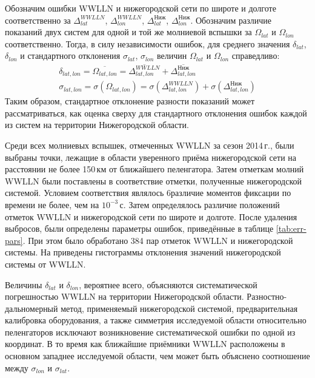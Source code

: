 Обозначим ошибки WWLLN и нижегородской сети по широте и долготе соответственно за $\Delta_{lat}^{WWLLN}$, $\Delta_{lon}^{WWLLN}$, $\Delta_{lat}^{\text{Ниж}}$, $\Delta_{lon}^{\text{Ниж}}$. Обозначим различие показаний двух систем для одной и той же молниевой вспышки за $\Omega_{lat}$ и $\Omega_{lon}$ соответственно. Тогда, в силу независимости ошибок, для среднего значения $\delta_{lat}$, $\delta_{lon}$ и стандартного отклонения $\sigma_{lat}$, $\sigma_{lon}$ величин $\Omega_{lat}$ и $\Omega_{lon}$ справедливо:
\begin{equation}
	\begin{gathered}
		\delta_{lat, lon} = \overline{\Omega_{lat,lon}} = \overline {\Delta_{lat,lon}^{WWLLN}} + \overline {\Delta_{lat,lon}^{\text{Ниж}}}\\
		\sigma_{lat, lon} = \sigma(\Omega_{lat,lon}) = \sigma (\Delta_{lat,lon}^{WWLLN}) + \sigma (\Delta_{lat,lon}^{\text{Ниж}})
	\end{gathered}
\end{equation}
Таким образом, стандартное отклонение разности показаний может рассматриваться, как оценка сверху для стандартного отклонения ошибок каждой из систем на территории Нижегородской области.

Среди всех молниевых вспышек, отмеченных WWLLN за сезон 2014\,г., были выбраны точки, лежащие в области уверенного приёма нижегородской сети на расстоянии не более 150\,км от ближайшего пеленгатора. Затем отметкам молний WWLLN были поставлены в соответствие отметки, полученные нижегородской системой. Условием соответствия являлось 6различие моментов фиксации по времени не более, чем на $10^{-3}$\,с. Затем определялось различие положений отметок WWLLN и нижегородской сети по широте и долготе. После удаления выбросов, были определены параметры ошибок, приведённые в таблице \ref{tab:err-pars}. При этом было обработано 384 пар отметок WWLLN и нижегородской системы. На  приведены гистограммы отклонения значений нижегородской системы от WWLLN.

Величины  $\delta_{lat}$ и $\delta_{lon}$, вероятнее всего, объясняются систематической погрешностью WWLLN на территории Нижегородской области. Разностно-дальномерный метод, применяемый нижегородской системой, предварительная калибровка оборудования, а также симметрия исследуемой области относительно пеленгаторов исключают возникновение систематической ошибки по одной из координат. В то время как ближайшие приёмники WWLLN расположены в основном западнее исследуемой области, чем может быть объяснено соотношение между $\sigma_{lon}$ и $\sigma_{lat}$.

